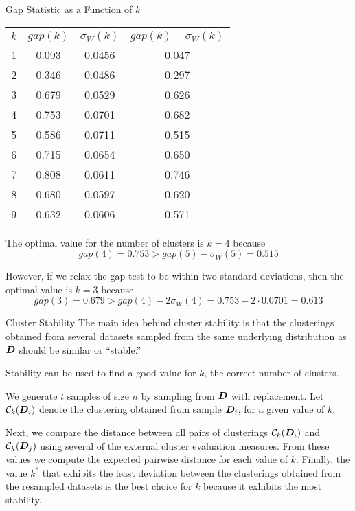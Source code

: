 \begin{frame}{Gap Statistic as a Function of $\textit{k}$}
\renewcommand{\arraystretch}{1.1} 
\begin{center}
\begin{tabular}{|c|ccc|}
    \hline
$k$ &  $gap(k)$ & $\sigma_W(k)$ & $gap(k)-\sigma_W(k)$\\
\hline
1 &  0.093 &0.0456 &0.047\\
2 &  0.346 &0.0486 &0.297\\
3 &  0.679 &0.0529 &0.626\\
4 &  0.753 &0.0701 &0.682\\
5 &  0.586 &0.0711 &0.515\\
6 &  0.715 &0.0654 &0.650\\
7 &  0.808 &0.0611 &0.746\\
8 &  0.680 &0.0597 &0.620\\
9 &  0.632 &0.0606 &0.571\\
\hline
  \end{tabular}%
\end{center}
The optimal value for the number of clusters is
$k=4$ because
$$gap(4) = 0.753 > gap(5)-\sigma_W(5) = 0.515$$

\medskip
However, if we
relax the gap test to be within two standard deviations, then the
optimal value is $k=3$ because
$$gap(3) = 0.679 >
gap(4)-2\sigma_W(4) = 0.753-2\cdot0.0701 = 0.613$$
\end{frame}

\ifdefined\wox \begin{frame} \titlepage \end{frame} \fi

\begin{frame}{Cluster Stability}
The main idea behind cluster stability is that the clusterings obtained
from several datasets sampled from the same underlying distribution as
${\boldsymbol D}$ should be similar or ``stable.''

\medskip
Stability can be
used to f\/{i}nd  a good value for
$k$, the correct number of clusters.

\medskip
We generate $t$ samples of size $n$ by sampling from ${\boldsymbol D}$
with replacement.
Let ${\mathcal C}_k({\boldsymbol D}_i)$ denote the
clustering obtained from sample ${\boldsymbol D}_i$, for a given value of $k$. 

\medskip
Next,
we compare the distance between all pairs of clusterings
${\mathcal C}_k({\boldsymbol D}_i)$ and ${\mathcal C}_k({\boldsymbol D}_{j})$ using several 
of the external cluster evaluation measures.
From these values we compute the
expected pairwise distance for each value of $k$.  F{i}nally, the value
$k^*$ that exhibits the least deviation between the clusterings obtained
from the resampled datasets is the best choice for $k$ because it
exhibits the most stability.
\end{frame}



